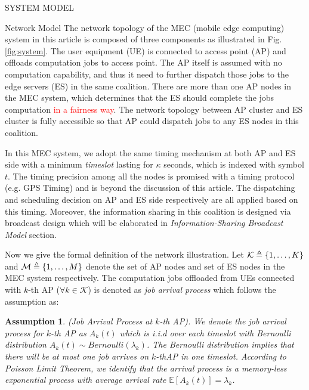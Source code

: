 \documentclass[10pt, conference, letterpaper]{IEEEtran}
\newtheorem{assumption}{Assumption}
\newcommand{\define}{\triangleq}
\DeclarePairedDelimiter{\set}{\{}{\}}
\newcommand{\apSet}{\mathcal{K}}
\begin{document}
    \begin{section}{SYSTEM MODEL}
        \label{sec:model}
        \begin{subsection}{Network Model}
            The network topology of the MEC (mobile edge computing) system in this article is composed of three components as illustrated in Fig. \ref{fig:system}.
            The user equipment (UE) is connected to access point (AP) and offloads computation jobs to access point. The AP itself is assumed with no computation capability, and thus it need to further dispatch those jobs to the edge servers (ES) in the same coalition. There are more than one AP nodes in the MEC system, which determines that the ES should complete the jobs computation \textcolor{red}{in a fairness way}. The network topology between AP cluster and ES cluster is fully accessible so that AP could dispatch jobs to any ES nodes in this coalition.

            In this MEC system, we adopt the same timing mechanism at both AP and ES side with a minimum \emph{timeslot} lasting for $\kappa$ seconds, which is indexed with symbol $t$. The timing precision among all the nodes is promised with a timing protocol (e.g. GPS Timing) and is beyond the discussion of this article. The dispatching and scheduling decision on AP and ES side respectively are all applied based on this timing. Moreover, the information sharing in this coalition is designed via broadcast design which will be elaborated in \emph{Information-Sharing Broadcast Model} section.

            Now we give the formal definition of the network illustration. Let $\apSet \define \set{1,\dots,K}$ and $\mathcal{M} \define \set{1,\dots,M}$ denote the set of AP nodes and set of ES nodes in the MEC system respectively. The computation jobs offloaded from UEs connected with $k$-th AP ($\forall k\in\apSet$) is denoted as \emph{job arrival process} which follows the assumption as:
            \begin{assumption}
                (Job Arrival Process at $k$-th AP).
                We denote the job arrival process for $k$-th AP as $A_k(t)$ which is i.i.d over each timeslot with Bernoulli distribution $A_k(t) \sim Bernoulli(\lambda_k)$. The Bernoulli distribution implies that there will be at most one job arrives on $k$-thAP in one timeslot. According to Poisson Limit Theorem, we identify that the arrival process is a memory-less exponential process with average arrival rate $\mathbb{E}[A_k(t)] = \lambda_k$.
            \end{assumption}
            

\end{subsection}
\end{section}
\end{document}
